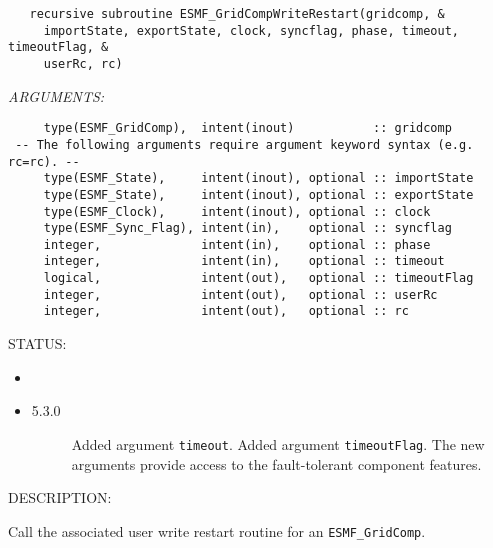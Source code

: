   
\begin{verbatim}   recursive subroutine ESMF_GridCompWriteRestart(gridcomp, &
     importState, exportState, clock, syncflag, phase, timeout, timeoutFlag, &
     userRc, rc)\end{verbatim}{\em ARGUMENTS:}
\begin{verbatim}     type(ESMF_GridComp),  intent(inout)           :: gridcomp
 -- The following arguments require argument keyword syntax (e.g. rc=rc). --
     type(ESMF_State),     intent(inout), optional :: importState
     type(ESMF_State),     intent(inout), optional :: exportState
     type(ESMF_Clock),     intent(inout), optional :: clock
     type(ESMF_Sync_Flag), intent(in),    optional :: syncflag
     integer,              intent(in),    optional :: phase
     integer,              intent(in),    optional :: timeout
     logical,              intent(out),   optional :: timeoutFlag
     integer,              intent(out),   optional :: userRc
     integer,              intent(out),   optional :: rc\end{verbatim}
{\sf STATUS:}
   \begin{itemize}
   \item{}
   \item{}
   \begin{description}
   \item[5.3.0] Added argument {\tt timeout}.
                Added argument {\tt timeoutFlag}.
                The new arguments provide access to the fault-tolerant component
                features.
   \end{description}
   \end{itemize}
  
{\sf DESCRIPTION:\\ }


   Call the associated user write restart routine for
   an {\tt ESMF\_GridComp}.
  
